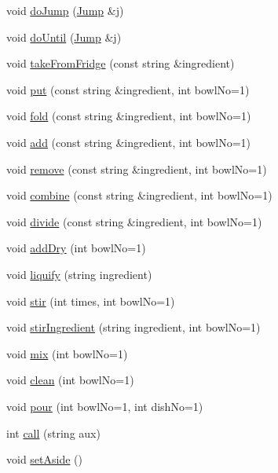 \begin{DoxyCompactItemize}
\item 
void \hyperlink{group__Command_ga003607cfe3ab13de0bc6b85d659856bc}{do\-Jump} (\hyperlink{structJump}{Jump} \&j)
\item 
void \hyperlink{group__Command_gadad4684f1b60dbabd7ac9b8ac9816d32}{do\-Until} (\hyperlink{structJump}{Jump} \&j)
\item 
void \hyperlink{group__Command_ga5119039470b26422e6ec843515d4a720}{take\-From\-Fridge} (const string \&ingredient)
\item 
void \hyperlink{group__Command_ga928df02758f8f959f4beeb153ddde7d6}{put} (const string \&ingredient, int bowl\-No=1)
\item 
void \hyperlink{group__Command_gaf5f825d69a4a19837a0714715710734a}{fold} (const string \&ingredient, int bowl\-No=1)
\item 
void \hyperlink{group__Command_ga385cb79270fb9c857256ef79ff65010e}{add} (const string \&ingredient, int bowl\-No=1)
\item 
void \hyperlink{group__Command_ga31fa0f785049498f85ab6e299217c7ab}{remove} (const string \&ingredient, int bowl\-No=1)
\item 
void \hyperlink{group__Command_ga276a0e85ac154372bf1c4cdaf7304d09}{combine} (const string \&ingredient, int bowl\-No=1)
\item 
void \hyperlink{group__Command_ga5d32e4fe23897d4dbb0b10eb4821baeb}{divide} (const string \&ingredient, int bowl\-No=1)
\item 
void \hyperlink{group__Command_ga7c657ea9ec19dfb55292a7474fe12511}{add\-Dry} (int bowl\-No=1)
\item 
void \hyperlink{group__Command_gadf633f6ac72e47c575d128c5c6a32615}{liquify} (string ingredient)
\item 
void \hyperlink{group__Command_ga5b48c67eb04fc71c199bdf611c387c9e}{stir} (int times, int bowl\-No=1)
\item 
void \hyperlink{group__Command_ga1f10bdb32b627eaa025d1313dbdc3c40}{stir\-Ingredient} (string ingredient, int bowl\-No=1)
\item 
void \hyperlink{group__Command_gad9a02b3a48b606ba17dc91337c3f64c2}{mix} (int bowl\-No=1)
\item 
void \hyperlink{group__Command_gae041e0eb15d1e40fe513b53803810dac}{clean} (int bowl\-No=1)
\item 
void \hyperlink{group__Command_ga03848074a9e527439e6381e47d9f3749}{pour} (int bowl\-No=1, int dish\-No=1)
\item 
int \hyperlink{group__Command_ga8822f6ec69a54e51222299b96e3b1923}{call} (string aux)
\item 
void \hyperlink{group__Command_ga4889710ccae668fb039e4dfa0ea2dae7}{set\-Aside} ()
\end{DoxyCompactItemize}
